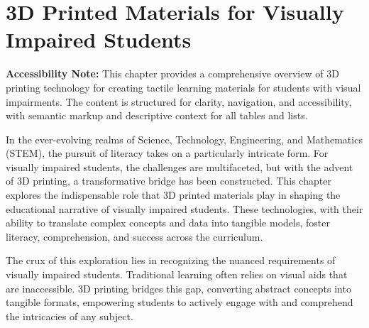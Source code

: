 \chapter{3D Printed Materials for Visually Impaired Students}\label{ch5:3d-printing}
\raggedright

\begin{raggedright}
	\textbf{Accessibility Note:} This chapter provides a comprehensive overview of 3D printing technology for creating tactile learning materials for students with visual impairments. The content is structured for clarity, navigation, and accessibility, with semantic markup and descriptive context for all tables and lists.
\end{raggedright}

In the ever-evolving realms of Science, Technology, Engineering, and Mathematics (STEM), the pursuit of literacy takes on a particularly intricate form. For visually impaired students, the challenges are multifaceted, but with the advent of 3D printing, a transformative bridge has been constructed. This chapter explores the indispensable role that 3D printed materials play in shaping the educational narrative of visually impaired students. These technologies, with their ability to translate complex concepts and data into tangible models, foster literacy, comprehension, and success across the curriculum.\supercite{DassaultEducation, TechLearning2023, TeachThought2021, Karbowski2020}

The crux of this exploration lies in recognizing the nuanced requirements of visually impaired students. Traditional learning often relies on visual aids that are inaccessible. 3D printing bridges this gap, converting abstract concepts into tangible formats, empowering students to actively engage with and comprehend the intricacies of any subject.\supercite{MatterHackers2017, See3D}

